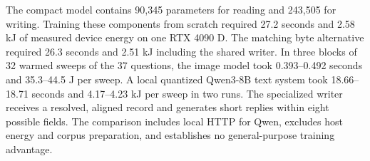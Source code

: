 The compact model contains 90,345 parameters for reading and 243,505 for writing. Training these components from scratch required 27.2 seconds and 2.58 kJ of measured device energy on one RTX 4090 D. The matching byte alternative required 26.3 seconds and 2.51 kJ including the shared writer. In three blocks of 32 warmed sweeps of the 37 questions, the image model took 0.393--0.492 seconds and 35.3--44.5 J per sweep. A local quantized Qwen3-8B text system took 18.66--18.71 seconds and 4.17--4.23 kJ per sweep in two runs. The specialized writer receives a resolved, aligned record and generates short replies within eight possible fields. The comparison includes local HTTP for Qwen, excludes host energy and corpus preparation, and establishes no general-purpose training advantage.
